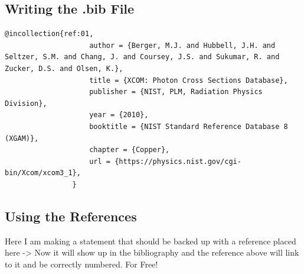 \documentclass[hidelinks, 12pt]{article}%
\begin{document}
        \subsection{Writing the .bib File}
            \begin{lstlisting}[language={[LaTeX]TeX}]
                @incollection{ref:01,
                    author = {Berger, M.J. and Hubbell, J.H. and Seltzer, S.M. and Chang, J. and Coursey, J.S. and Sukumar, R. and Zucker, D.S. and Olsen, K.},
                    title = {XCOM: Photon Cross Sections Database},
                    publisher = {NIST, PLM, Radiation Physics Division},
                    year = {2010},
                    booktitle = {NIST Standard Reference Database 8 (XGAM)},
                    chapter = {Copper},
                    url = {https://physics.nist.gov/cgi-bin/Xcom/xcom3_1},
                }
            \end{lstlisting}
        \subsection{Using the References}
            Here I am making a statement that should be backed up with a reference placed here -> \cite{ref:01}
            Now it will show up in the bibliography and the reference above will link to it and be 
            correctly numbered. For Free!
        
    \clearpage
    \printbibliography[heading=bibintoc]
\end{document}
